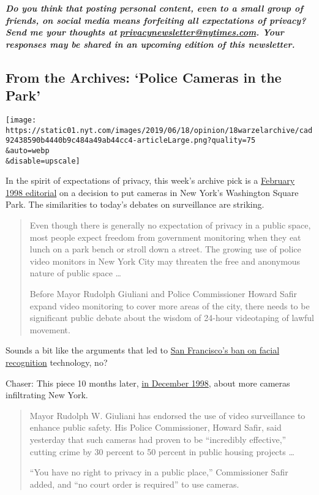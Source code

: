 \emph{\textbf{Do you think that posting personal content, even to a
small group of friends, on social media means forfeiting all
expectations of privacy? Send me your thoughts at}}
\textbf{\href{mailto:privacynewsletter@nytimes.com}{\emph{privacynewsletter@nytimes.com}}\emph{.
Your responses may be shared in an upcoming edition of this
newsletter.}}

\hypertarget{from-the-archives-police-cameras-in-the-park}{%
\subsection{From the Archives: `Police Cameras in the
Park'}\label{from-the-archives-police-cameras-in-the-park}}

\texttt{[image: https://static01.nyt.com/images/2019/06/18/opinion/18warzelarchive/cad92438590b4440b9c484a49ab44cc4-articleLarge.png?quality=75\\\&auto=webp\\\&disable=upscale]}

In the spirit of expectations of privacy, this week's archive pick is a
\href{https://www.nytimes.com/1998/02/09/opinion/police-cameras-in-the-park.html}{February
1998 editorial} on a decision to put cameras in New York's Washington
Square Park. The similarities to today's debates on surveillance are
striking.

\begin{quote}
Even though there is generally no expectation of privacy in a public
space, most people expect freedom from government monitoring when they
eat lunch on a park bench or stroll down a street. The growing use of
police video monitors in New York City may threaten the free and
anonymous nature of public space \ldots{}

Before Mayor Rudolph Giuliani and Police Commissioner Howard Safir
expand video monitoring to cover more areas of the city, there needs to
be significant public debate about the wisdom of 24-hour videotaping of
lawful movement.
\end{quote}

Sounds a bit like the arguments that led to
\href{https://www.nytimes.com/2019/05/14/us/facial-recognition-ban-san-francisco.html}{San
Francisco's ban on facial recognition} technology, no?

Chaser: This piece 10 months later,
\href{https://www.nytimes.com/1998/12/13/nyregion/secret-surveillance-cameras-growing-in-city-report-says.html}{in
December 1998}, about more cameras infiltrating New York.

\begin{quote}
Mayor Rudolph W. Giuliani has endorsed the use of video surveillance to
enhance public safety. His Police Commissioner, Howard Safir, said
yesterday that such cameras had proven to be ``incredibly effective,''
cutting crime by 30 percent to 50 percent in public housing projects
\ldots{}

``You have no right to privacy in a public place,'' Commissioner Safir
added, and ``no court order is required'' to use cameras.
\end{quote}

